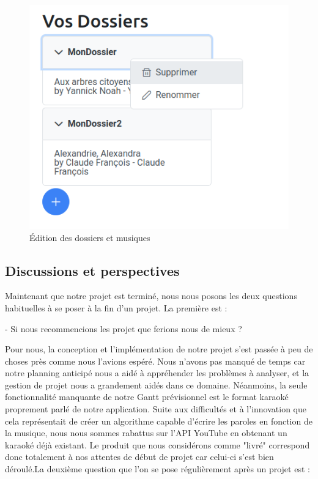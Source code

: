 \documentclass[12pt,french]{article}
\begin{document}
\begin{figure}[H]
\begin{minipage}{.3\textwidth}
	\end{minipage}
\begin{minipage}{.3\textwidth}
	\centering
	\includegraphics[scale=0.4]{dossier5.png}
\end{minipage}
	\caption{Édition des dossiers et musiques}    
\end{figure}

\newpage
\vspace*{1cm}

\subsection{Discussions et perspectives}

Maintenant que notre projet est terminé, nous nous posons les deux questions habituelles à se poser à la fin d'un projet. La première est : 
\newline

- Si nous recommencions les projet que ferions nous de mieux ?  
\newline


Pour nous, la conception et l'implémentation de notre projet s'est passée à peu de choses près comme nous l'avions espéré. Nous n'avons pas manqué de temps car notre planning anticipé nous a aidé à appréhender les problèmes à analyser, et la gestion de projet nous a grandement aidés dans ce domaine. Néanmoins, la seule fonctionnalité manquante de notre Gantt prévisionnel est le format karaoké proprement parlé de notre application. Suite aux difficultés et à l'innovation que cela représentait de créer un algorithme capable d'écrire les paroles en fonction de la musique, nous nous sommes rabattus sur l'\gls{API} YouTube en obtenant un karaoké déjà existant. Le produit que nous considérons comme "livré" correspond donc totalement à nos attentes de début de projet car celui-ci s'est bien déroulé.La deuxième question que l'on se pose régulièrement après un projet est :
\newline
\end{document}
